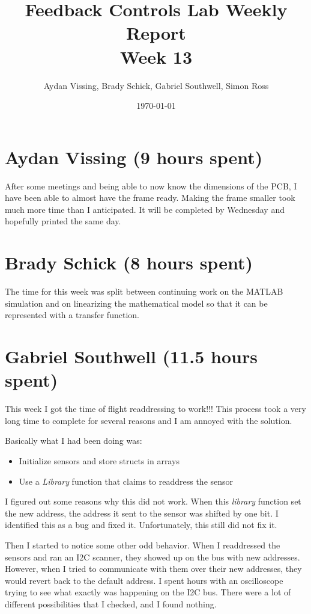 \documentclass[12pt, titlepage]{article}
\title{Feedback Controls Lab Weekly Report \\ \normalsize{Week 13}}
\author{Aydan Vissing, Brady Schick, Gabriel Southwell, Simon Ross}
\date{\today}
\begin{document}
\maketitle

\section*{Aydan Vissing (9 hours spent)}

After some meetings and being able to now know the dimensions of the PCB, I have been able to almost have the frame ready. Making the frame smaller took much more time than I anticipated. It will be completed by Wednesday and hopefully printed the same day. 

\section*{Brady Schick (8 hours spent)}

The time for this week was split between continuing work on the MATLAB simulation and on linearizing the mathematical model so that it can be represented with a transfer function.

\section*{Gabriel Southwell (11.5 hours spent)}

This week I got the time of flight readdressing to work!!! This process took a very long time to complete for several reasons and I am annoyed with the solution. 

Basically what I had been doing was:
\begin{itemize}
    \item Initialize sensors and store structs in arrays
    \item Use a \textit{Library} function that claims to readdress the sensor
\end{itemize}

I figured out some reasons why this did not work. When this \textit{library} function set the new address, the address it sent to the sensor was shifted by one bit. I identified this as a bug and fixed it. Unfortunately, this still did not fix it. 

Then I started to notice some other odd behavior. When I readdressed the sensors and ran an I2C scanner, they showed up on the bus with new addresses. However, when I tried to communicate with them over their new addresses, they would revert back to the default address. I spent hours with an oscilloscope trying to see what exactly was happening on the I2C bus. There were a lot of different possibilities that I checked, and I found nothing. 
\end{document}
